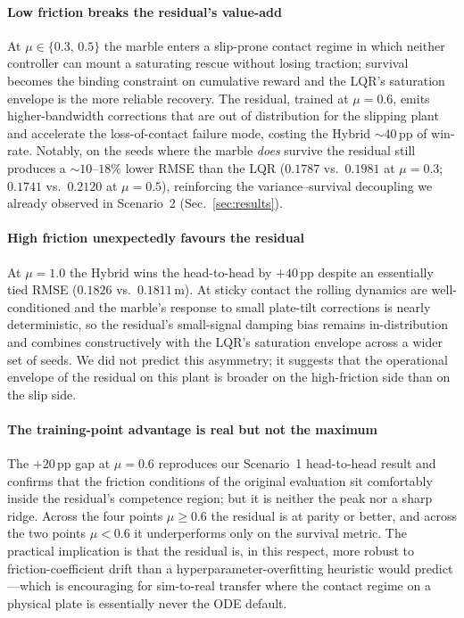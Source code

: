\documentclass[conference]{IEEEtran}
\begin{document}
\paragraph*{Low friction breaks the residual's value-add}
At $\mu \in \{0.3,\,0.5\}$ the marble enters a slip-prone contact regime
in which neither controller can mount a saturating rescue without
losing traction; survival becomes the binding constraint on cumulative
reward and the LQR's saturation envelope is the more reliable recovery.
The residual, trained at $\mu=0.6$, emits higher-bandwidth corrections
that are out of distribution for the slipping plant and accelerate the
loss-of-contact failure mode, costing the Hybrid $\sim\!40\,$pp of
win-rate. Notably, on the seeds where the marble \emph{does} survive
the residual still produces a $\sim\!10$--$18\%$ lower RMSE than the
LQR ($0.1787$ vs.\ $0.1981$ at $\mu=0.3$; $0.1741$ vs.\ $0.2120$ at
$\mu=0.5$), reinforcing the variance--survival decoupling we already
observed in Scenario~2 (Sec.~\ref{sec:results}).

\paragraph*{High friction unexpectedly favours the residual}
At $\mu=1.0$ the Hybrid wins the head-to-head by $+40\,$pp despite an
essentially tied RMSE ($0.1826$ vs.\ $0.1811\,$m). At sticky contact
the rolling dynamics are well-conditioned and the marble's response to
small plate-tilt corrections is nearly deterministic, so the residual's
small-signal damping bias remains in-distribution and combines
constructively with the LQR's saturation envelope across a wider set of
seeds. We did not predict this asymmetry; it suggests that the
operational envelope of the residual on this plant is broader on the
high-friction side than on the slip side.

\paragraph*{The training-point advantage is real but not the maximum}
The $+20\,$pp gap at $\mu=0.6$ reproduces our Scenario~1 head-to-head
result and confirms that the friction conditions of the original
evaluation sit comfortably inside the residual's competence region;
but it is neither the peak nor a sharp ridge. Across the four points
$\mu \ge 0.6$ the residual is at parity or better, and across the two
points $\mu < 0.6$ it underperforms only on the survival metric. The
practical implication is that the residual is, in this respect, more
robust to friction-coefficient drift than a hyperparameter-overfitting
heuristic would predict---which is encouraging for sim-to-real transfer
where the contact regime on a physical plate is essentially never the
ODE default.
\end{document}
